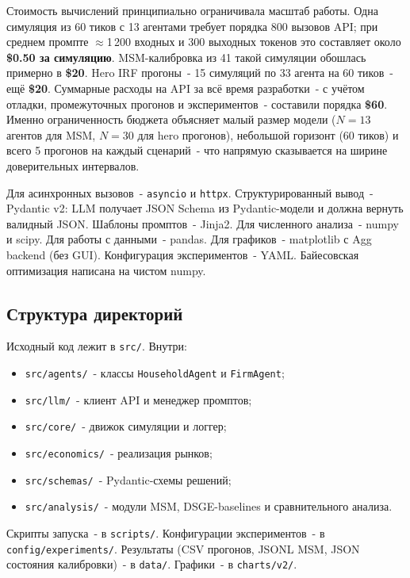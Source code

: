 \documentclass[12pt, a4paper]{article}
\begin{document}
Стоимость вычислений принципиально ограничивала масштаб работы. Одна симуляция из 60 тиков с 13 агентами требует порядка 800 вызовов API; при среднем промпте $\approx$1\,200 входных и 300 выходных токенов это составляет около \textbf{\$0.50 за симуляцию}. MSM-калибровка из 41 такой симуляции обошлась примерно в \textbf{\$20}. Hero IRF прогоны~- 15 симуляций по 33 агента на 60 тиков~- ещё \textbf{\$20}. Суммарные расходы на API за всё время разработки~- с учётом отладки, промежуточных прогонов и экспериментов~- составили порядка \textbf{\$60}. Именно ограниченность бюджета объясняет малый размер модели ($N = 13$ агентов для MSM, $N = 30$ для hero прогонов), небольшой горизонт (60 тиков) и всего 5 прогонов на каждый сценарий~- что напрямую сказывается на ширине доверительных интервалов.

Для асинхронных вызовов~- \texttt{asyncio} и \texttt{httpx}. Структурированный вывод~- Pydantic v2: LLM получает JSON Schema из Pydantic-модели и должна вернуть валидный JSON. Шаблоны промптов~- Jinja2. Для численного анализа~- numpy и scipy. Для работы с данными~- pandas. Для графиков~- matplotlib с Agg backend (без GUI). Конфигурация экспериментов~- YAML. Байесовская оптимизация написана на чистом numpy.

\subsection{Структура директорий}

Исходный код лежит в \texttt{src/}. Внутри:
\begin{itemize}
  \item \texttt{src/agents/}~- классы \texttt{HouseholdAgent} и \texttt{FirmAgent};
  \item \texttt{src/llm/}~- клиент API и менеджер промптов;
  \item \texttt{src/core/}~- движок симуляции и логгер;
  \item \texttt{src/economics/}~- реализация рынков;
  \item \texttt{src/schemas/}~- Pydantic-схемы решений;
  \item \texttt{src/analysis/}~- модули MSM, DSGE-baselines и сравнительного анализа.
\end{itemize}

Скрипты запуска~- в \texttt{scripts/}. Конфигурации экспериментов~- в \texttt{config/experiments/}. Результаты (CSV прогонов, JSONL MSM, JSON состояния калибровки)~- в \texttt{data/}. Графики~- в \texttt{charts/v2/}.
\end{document}
